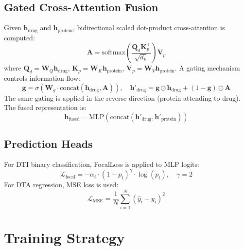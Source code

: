 \documentclass[12pt,a4paper,oneside]{report}
\begin{document}
\subsection{Gated Cross-Attention Fusion}

Given $\mathbf{h}_{\text{drug}}$ and $\mathbf{h}_{\text{protein}}$, bidirectional scaled dot-product cross-attention is computed:
\begin{equation}
\mathbf{A} = \mathrm{softmax}\!\left( \frac{\mathbf{Q}_d \mathbf{K}_p^\top}{\sqrt{d_k}} \right) \mathbf{V}_p
\label{eq:cross-attn}
\end{equation}
where $\mathbf{Q}_d = \mathbf{W}_Q \mathbf{h}_{\text{drug}}$, $\mathbf{K}_p = \mathbf{W}_K \mathbf{h}_{\text{protein}}$, $\mathbf{V}_p = \mathbf{W}_V \mathbf{h}_{\text{protein}}$. A gating mechanism controls information flow:
\begin{equation}
\mathbf{g} = \sigma\!\left(\mathbf{W}_g \cdot \mathrm{concat}(\mathbf{h}_{\text{drug}}, \mathbf{A})\right),
\quad
\mathbf{h}'_{\text{drug}} = \mathbf{g} \odot \mathbf{h}_{\text{drug}} + (1-\mathbf{g}) \odot \mathbf{A}
\label{eq:gate}
\end{equation}
The same gating is applied in the reverse direction (protein attending to drug). The fused representation is:
\begin{equation}
\mathbf{h}_{\text{fused}} = \mathrm{MLP}\!\left(\mathrm{concat}(\mathbf{h}'_{\text{drug}}, \mathbf{h}'_{\text{protein}})\right)
\label{eq:fused}
\end{equation}

\subsection{Prediction Heads}

For DTI binary classification, FocalLoss is applied to MLP logits:
\begin{equation}
\mathcal{L}_{\text{focal}} = -\alpha_t \cdot (1 - p_t)^\gamma \cdot \log(p_t), \quad \gamma = 2
\label{eq:focal}
\end{equation}
For DTA regression, MSE loss is used:
\begin{equation}
\mathcal{L}_{\text{MSE}} = \frac{1}{N}\sum_{i=1}^{N} (\hat{y}_i - y_i)^2
\label{eq:mse}
\end{equation}

\section{Training Strategy}
\end{document}
